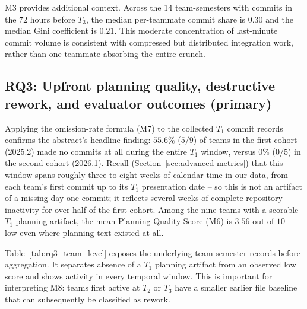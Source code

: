 \documentclass[conference]{IEEEtran}
\begin{document}
M3 provides additional context. Across the 14 team-semesters with commits
in the 72 hours before $T_3$, the median per-teammate commit share is $0.30$
and the median Gini coefficient is $0.21$. This moderate concentration of
last-minute commit volume is consistent with compressed but distributed
integration work, rather than one teammate absorbing the entire crunch.

\subsection{RQ3: Upfront planning quality, destructive rework, and evaluator outcomes (primary)}

Applying the omission-rate formula (M7) to the collected $T_1$ commit
records confirms the abstract's headline finding: $55.6\%$ ($5/9$) of teams
in the first cohort (2025.2) made no commits at all during the entire $T_1$
window, versus $0\%$ ($0/5$) in the second cohort (2026.1). Recall
(Section~\ref{sec:advanced-metrics}) that this window spans roughly three
to eight weeks of calendar time in our data, from each team's first commit
up to its $T_1$ presentation date -- so this is not an artifact of a
missing day-one commit; it reflects several weeks of complete repository
inactivity for over half of the first cohort. Among the nine teams with a
scorable $T_1$ planning artifact, the mean Planning-Quality Score (M6) is
$3.56$ out of $10$ --- low even where planning text existed at all.

Table~\ref{tab:rq3_team_level} exposes the underlying team-semester records
before aggregation. It separates absence of a $T_1$ planning artifact from
an observed low score and shows activity in every temporal window. This is
important for interpreting M8: teams first active at $T_2$ or $T_3$ have a
smaller earlier file baseline that can subsequently be classified as rework.
\end{document}
